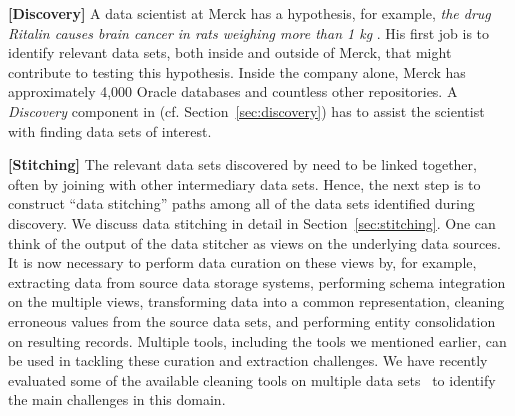 {\bf[Discovery]} A data scientist at Merck has a hypothesis, for example, {\it the drug Ritalin causes brain cancer in rats weighing more than 1 kg }.  His first job is to identify relevant data sets, both inside and outside of Merck, that might contribute to testing this hypothesis.  Inside the company alone, Merck has approximately  4,000 Oracle databases and countless other repositories.  A {\it Discovery} component in \dcv (cf. Section~\ref{sec:discovery}) has to assist the scientist with finding data sets of interest.

{\bf[Stitching]} The relevant data sets discovered by \dcv  need to be  linked together, often by joining with other intermediary data sets.  Hence, the next step is to construct ``data stitching'' paths among all of the data sets identified during discovery.  We discuss data stitching in detail 
in Section~\ref{sec:stitching}. One can think of the output of the data stitcher as views on the underlying data sources. It is now necessary to perform data curation on these views by, for example, extracting data from source data storage systems, performing schema integration on the multiple views, transforming data into a common representation, cleaning erroneous values from the source data sets, and performing entity consolidation on resulting records. Multiple tools, including the tools we mentioned earlier, can be used in tackling these curation and extraction challenges. We have recently evaluated some of the available cleaning tools on multiple data sets~\cite{evaluatioin} to identify the main challenges in this domain.

